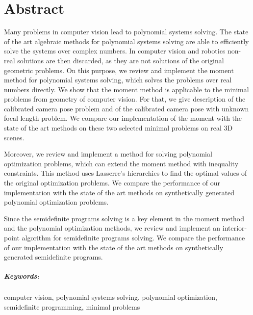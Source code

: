 \chapter*{Abstract}
Many problems in computer vision lead to polynomial systems solving.
The state of the art algebraic methods for polynomial systems solving are able to efficiently solve the systems over complex numbers.
In computer vision and robotics non-real solutions are then discarded, as they are not solutions of the original geometric problems.
On this purpose, we review and implement the moment method for polynomial systems solving, which solves the problems over real numbers directly.
We show that the moment method is applicable to the minimal problems from geometry of computer vision.
For that, we give description of the calibrated camera pose problem and of the calibrated camera pose with unknown focal length problem.
We compare our implementation of the moment with the state of the art methods on these two selected minimal problems on real 3D scenes.

Moreover, we review and implement a method for solving polynomial optimization problems, which can extend the moment method with inequality constraints.
This method uses Lasserre's hierarchies to find the optimal values of the original optimization problems.
We compare the performance of our implementation with the state of the art methods on synthetically generated polynomial optimization problems.

Since the semidefinite programs solving is a key element in the moment method and the polynomial optimization methods, we review and implement an interior-point algorithm for semidefinite programs solving.
We compare the performance of our implementation with the state of the art methods on synthetically generated semidefinite programs.

\paragraph{Keywords:}
computer vision, polynomial systems solving, polynomial optimization, semidefinite programming, minimal problems

